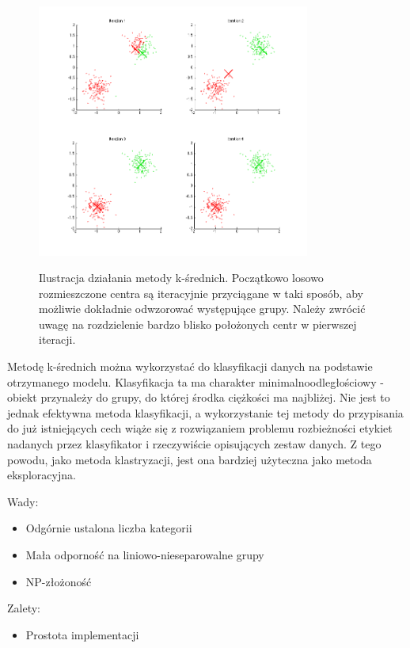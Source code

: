 \documentclass[12pt,a4paper,oneside]{report} %
\begin{document}
\begin{figure}
\centering
\includegraphics[width=0.8\textwidth]{kmeans.png}
\label{kmeans-png}
\caption{Ilustracja działania metody k-średnich. Początkowo losowo rozmieszczone centra są iteracyjnie przyciągane w taki sposób, aby możliwie dokładnie odwzorować występujące grupy. Należy zwrócić uwagę na rozdzielenie bardzo blisko położonych centr w pierwszej iteracji.}
\end{figure}

Metodę k-średnich można wykorzystać do klasyfikacji danych na podstawie otrzymanego modelu. Klasyfikacja ta ma charakter minimalnoodległościowy - obiekt przynależy do grupy, do której środka ciężkości ma najbliżej. Nie jest to jednak efektywna metoda klasyfikacji, a wykorzystanie tej metody do przypisania do już istniejących cech wiąże się z rozwiązaniem problemu rozbieżności etykiet nadanych przez klasyfikator i rzeczywiście opisujących zestaw danych. Z tego powodu, jako metoda klastryzacji, jest ona bardziej użyteczna jako metoda eksploracyjna. \par
\vspace{0.5cm}
Wady:\par
\begin{itemize}
\item Odgórnie ustalona liczba kategorii
\item Mała odporność na liniowo-nieseparowalne grupy
\item NP-złożoność
\end{itemize}\par
Zalety:\par
\begin{itemize}
\item Prostota implementacji
\end{itemize}\par
\end{document}
